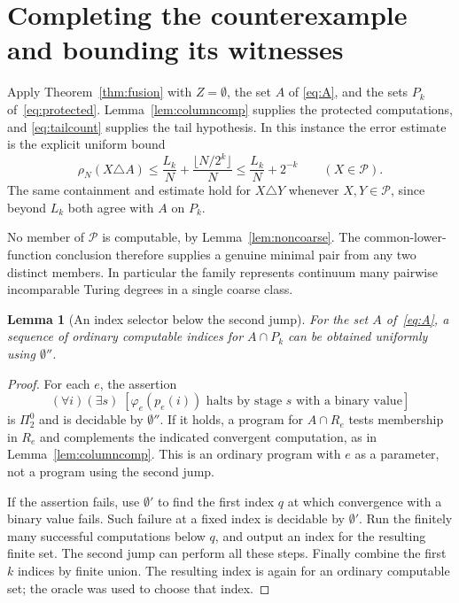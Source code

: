 \documentclass[11pt,a4paper]{article}
\newtheorem{lemma}[theorem]{Lemma}
\theoremstyle{definition}
\theoremstyle{remark}
\begin{document}
\section{Completing the counterexample and bounding its witnesses}
\label{sec:mainproof}
Apply Theorem~\ref{thm:fusion} with $Z=\emptyset$, the set $A$ of
\eqref{eq:A}, and the sets $P_k$ of~\eqref{eq:protected}.
Lemma~\ref{lem:columncomp} supplies the protected computations, and
\eqref{eq:tailcount} supplies the tail hypothesis. In this instance the
error estimate is the explicit uniform bound
\begin{equation}\label{eq:explicitbudget}
 \rho_N(X\triangle A)
 \le\frac{L_k}{N}+\frac{\lfloor N/2^k\rfloor}{N}
 \le\frac{L_k}{N}+2^{-k}
 \qquad(X\in\mathcal P).
\end{equation}
The same containment and estimate hold for $X\triangle Y$ whenever
$X,Y\in\mathcal P$, since beyond $L_k$ both agree with $A$ on $P_k$.

No member of $\mathcal P$ is computable, by Lemma~\ref{lem:noncoarse}.
The common-lower-function conclusion therefore supplies a genuine minimal
pair from any two distinct members. In particular the family represents
continuum many pairwise incomparable Turing degrees in a single coarse class.

\begin{lemma}[An index selector below the second jump]\label{lem:selector}
For the set $A$ of~\eqref{eq:A}, a sequence of ordinary computable indices
for $A\cap P_k$ can be obtained uniformly using $\emptyset''$.
\end{lemma}
\begin{proof}
For each $e$, the assertion
\[
 (\forall i)(\exists s)\;
 [\varphi_e(p_e(i))\text{ halts by stage }s\text{ with a binary value}]
\]
is $\Pi^0_2$ and is decidable by $\emptyset''$.
If it holds, a program for $A\cap R_e$ tests membership in $R_e$ and
complements the indicated convergent computation, as in
Lemma~\ref{lem:columncomp}. This is an ordinary program with $e$ as a
parameter, not a program using the second jump.

If the assertion fails, use $\emptyset'$ to find the first index $q$ at
which convergence with a binary value fails. Such failure at a fixed
index is decidable by $\emptyset'$. Run the finitely many successful
computations below $q$, and output an index for the resulting finite set.
The second jump can perform all these steps. Finally combine the first
$k$ indices by finite union. The resulting index is again for an ordinary
computable set; the oracle was used to choose that index.
\end{proof}
\end{document}
